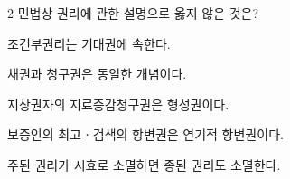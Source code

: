 \begin{question}{2}
민법상 권리에 관한 설명으로 옳지 않은 것은?
\begin{choices}
  \item 조건부권리는 기대권에 속한다.
  \item 채권과 청구권은 동일한 개념이다.
  \item 지상권자의 지료증감청구권은 형성권이다.
  \item 보증인의 최고ㆍ검색의 항변권은 연기적 항변권이다.
  \item 주된 권리가 시효로 소멸하면 종된 권리도 소멸한다.
\end{choices}
\end{question}
